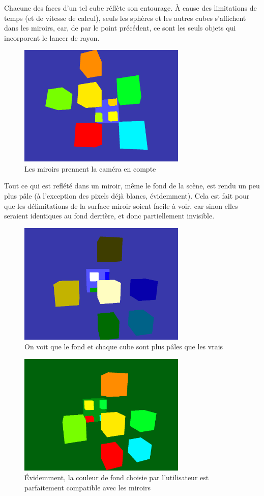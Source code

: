 Chacune des faces d'un tel cube réflète son entourage. À cause des limitations de temps (et de vitesse de calcul), seuls les sphères et les autres cubes s'affichent dans les miroirs, car, de par le point précédent, ce sont les seuls objets qui incorporent le lancer de rayon.

\begin{figure}[h]
	\centering
	\includegraphics[width=8cm]{fig/CubeReflection2.png}
	\caption{Les miroirs prennent la caméra en compte}
	\label{fig:propriete}
\end{figure}

Tout ce qui est reflété dans un miroir, même le fond de la scène, est rendu un peu plus pâle (à l'exception des pixels déjà blancs, évidemment). Cela est fait pour que les délimitations de la surface miroir soient facile à voir, car sinon elles seraient identiques au fond derrière, et donc partiellement invisible.

\begin{figure}[h]
	\centering
	\includegraphics[width=8cm]{fig/CubeReflection3.png}
	\caption{On voit que le fond et chaque cube sont plus pâles que les vrais}
	\label{fig:propriete}
\end{figure}

\begin{figure}[h]
	\centering
	\includegraphics[width=8cm]{fig/CubeReflectionBackground.png}
	\caption{Évidemment, la couleur de fond choisie par l'utilisateur est parfaitement compatible avec les miroirs}
	\label{fig:propriete}
\end{figure}

